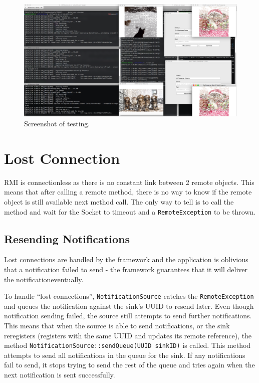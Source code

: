 \documentclass[a4paper]{article}
\begin{document}
\begin{figure}[h]
\includegraphics[width=\textwidth]{testing}
\caption{Screenshot of testing.\label{fig:testing}}
\end{figure}

\section{Lost Connection}\label{sec:lost_conns}
RMI is connectionless as there is no constant link between 2 remote objects.
This means that after calling a remote method, there is no way to know if the remote object is still available next method call.
The only way to tell is to call the method and wait for the Socket to timeout and a \texttt{RemoteException} to be thrown.

\subsection{Resending Notifications}
Lost connections are handled by the framework and the application is oblivious that a notification failed to send - the framework guarantees that it will deliver the notification\textellipsis eventually.

To handle ``lost connections'', \texttt{NotificationSource} catches the \texttt{RemoteException} and queues the notification against the sink's UUID to resend later.
Even though notification sending failed, the source still attempts to send further notifications.
This means that when the source is able to send notifications, or the sink reregisters (registers with the same UUID and updates its remote reference),
the method \texttt{NotificationSource::sendQueue(UUID sinkID)} is called.
This method attempts to send all notifications in the queue for the sink.
If any notifications fail to send, it stops trying to send the rest of the queue and tries again when the next notification is sent successfully.
\end{document}
